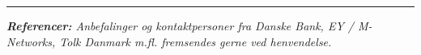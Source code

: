 \documentclass[9.5pt,a4paper]{article}
\begin{document}
\vspace{4pt}
{\color{boxborder}\rule{\linewidth}{0.5pt}}\vspace{2pt}
{\fontsize{7.5}{9.5}\selectfont\color{mutedgray}\textit{\textbf{Referencer:} Anbefalinger og kontaktpersoner fra Danske Bank, EY / M-Networks, Tolk Danmark m.fl. fremsendes gerne ved henvendelse.}}
\end{document}
